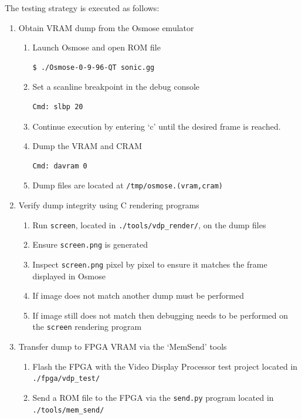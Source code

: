 \documentclass{article}
\begin{document}
The testing strategy is executed as follows:
\begin{enumerate}
    \item Obtain VRAM dump from the Osmose emulator
        \begin{enumerate}
            \item Launch Osmose and open ROM file
                \begin{verbatim}$ ./Osmose-0-9-96-QT sonic.gg\end{verbatim}
            \item Set a scanline breakpoint in the debug console
                \begin{verbatim}Cmd: slbp 20\end{verbatim}
            \item Continue execution by entering `c' until the desired frame is reached.
            \item Dump the VRAM and CRAM
                \begin{verbatim}Cmd: davram 0\end{verbatim}
            \item Dump files are located at \texttt{/tmp/osmose.(vram,cram)}
        \end{enumerate}
    \item Verify dump integrity using C rendering programs
        \begin{enumerate}
            \item Run \texttt{screen}, located in \texttt{./tools/vdp\_render/}, on the dump files
            \item Ensure \texttt{screen.png} is generated
            \item Inspect \texttt{screen.png} pixel by pixel to ensure it matches the frame displayed in Osmose
            \item If image does not match another dump must be performed
            \item If image still does not match then debugging needs to be performed on the \texttt{screen} rendering program
        \end{enumerate}
    \item Transfer dump to FPGA VRAM via the `MemSend' tools
        \begin{enumerate}
            \item Flash the FPGA with the Video Display Processor test project located in \texttt{./fpga/vdp\_test/}
            \item Send a ROM file to the FPGA via the \texttt{send.py} program located in \texttt{./tools/mem\_send/}

\end{enumerate}
\end{enumerate}
\end{document}
